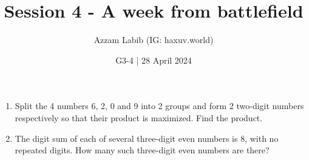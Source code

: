 \documentclass[11pt]{scrartcl}
\title{Session 4 - A week from battlefield}
\author{Azzam Labib (IG: haxuv.world)}
\date{G3-4 | 28 April 2024}
\begin{document}
\maketitle

\begin{enumerate}
    \section{Logical Thinking and Combinatorics}
    
    \item Split the 4 numbers 6, 2, 0 and 9 into 2 groups and form 2 two-digit numbers respectively so that their product is maximized. Find the product.
    
    \vspace{10cm} \item The digit sum of each of several three-digit even numbers is 8, with no repeated digits. How many such three-digit even numbers are there?
    
    
    

\end{enumerate}
\end{document}
